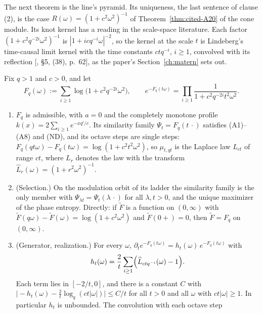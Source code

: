 The next theorem is the line's \Matern{} pyramid. Its uniqueness, the last sentence of clause (2), is
the case $R(\omega) = (1 + c^2\omega^2)^{-1}$ of Theorem~\ref{thm:cited-A20} of the cone module. Its
knot kernel has a reading in the scale-space literature. Each factor $(1 + c^2q^{-2i}\omega^2)^{-1}$
is $|1 + icq^{-i}\omega|^{-2}$, so the kernel at the scale $t$ is Lindeberg's time-causal limit
kernel with the time constants $ctq^{-i}$, $i \ge 1$, convolved with its reflection
[, \S 5, (38), p.~62], as the paper's Section~\ref{ch:matern} sets out.

\begin{theorem}
\label{thm:matern-pyramid-line}

Fix $q > 1$ and $c > 0$, and let
\begin{equation}\label{eq:line-e7}
  F_q(\omega) := \sum_{i \ge 1}\log\bigl(1 + c^2q^{-2i}\omega^2\bigr), \qquad
  e^{-F_q(t\omega)} = \prod_{i \ge 1}\frac{1}{1 + c^2q^{-2i}t^2\omega^2}.
\end{equation}
\begin{enumerate}
\item $F_q$ is admissible, with $a = 0$ and the completely monotone profile
$k(x) = 2\sum_{i \ge 1}e^{-xq^i/c}$. Its similarity family $\Psi_t = F_q(t\,\cdot)$ satisfies
(A1)--(A8) and (ND), and its octave steps are single \Matern{} steps:
$F_q(qt\omega) - F_q(t\omega) = \log(1 + c^2t^2\omega^2)$, so $\mu_{t,qt}$ is the Laplace law
$L_{ct}$ of range $ct$, where $L_r$ denotes the law with the transform
$\widehat L_r(\omega) = (1 + r^2\omega^2)^{-1}$.
\item (Selection.) On the modulation orbit of its ladder the similarity family is the only member
with $\Psi_{\lambda t} = \Psi_t(\lambda\,\cdot)$ for all $\lambda, t > 0$, and the unique maximizer of
the phase entropy. Directly: if $\tilde F$ is a function on $(0,\infty)$ with
$\tilde F(q\omega) - \tilde F(\omega) = \log(1 + c^2\omega^2)$ and $\tilde F(0{+}) = 0$, then
$\tilde F = F_q$ on $(0,\infty)$.
\item (Generator, realization.) For every $\omega$,
$\partial_te^{-F_q(t\omega)} = h_t(\omega)\,e^{-F_q(t\omega)}$ with
\[
  h_t(\omega) = \frac2t\sum_{i \ge 1}\Bigl(\widehat L_{ctq^{-i}}(\omega) - 1\Bigr).
\]
Each term lies in $[-2/t, 0]$, and there is a constant $C$ with
$\bigl|-h_t(\omega) - \tfrac2t\log_q(ct|\omega|)\bigr| \le C/t$ for all $t > 0$ and all $\omega$ with
$ct|\omega| \ge 1$. In particular $h_t$ is unbounded. The convolution with each octave step

\end{enumerate}
\end{theorem}

